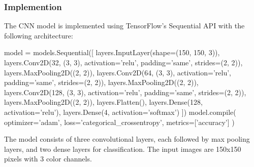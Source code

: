 \subsubsection{Implemention}
The CNN model is implemented using TensorFlow's Sequential API with the following architecture:
\vspace{0.3cm}
\begin{python}
model = models.Sequential([
    layers.InputLayer(shape=(150, 150, 3)), 
    layers.Conv2D(32, (3, 3), activation='relu', padding='same', strides=(2, 2)),
    layers.MaxPooling2D((2, 2)),
    layers.Conv2D(64, (3, 3), activation='relu', padding='same', strides=(2, 2)),
    layers.MaxPooling2D((2, 2)),
    layers.Conv2D(128, (3, 3), activation='relu', padding='same', strides=(2, 2)),
    layers.MaxPooling2D((2, 2)),
    layers.Flatten(),
    layers.Dense(128, activation='relu'),
    layers.Dense(4, activation='softmax')
])
model.compile(
    optimizer='adam',
    loss='categorical_crossentropy',
    metrics=['accuracy']
)
\end{python}

The model consists of three convolutional layers, each followed by max pooling layers, and two dense layers for classification. The input images are 150x150 pixels with 3 color channels.

